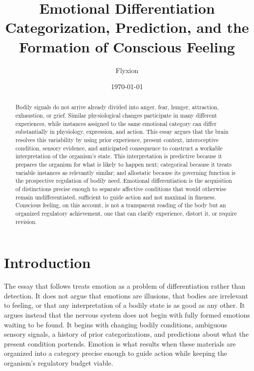 \documentclass[11pt]{article}
\title{Emotional Differentiation\\
\large Categorization, Prediction, and the Formation of Conscious Feeling}
\author{Flyxion}
\date{\today}
\begin{document}
\maketitle

\begin{abstract}
Bodily signals do not arrive already divided into anger, fear, hunger, attraction, exhaustion, or grief. Similar physiological changes participate in many different experiences, while instances assigned to the same emotional category can differ substantially in physiology, expression, and action. This essay argues that the brain resolves this variability by using prior experience, present context, interoceptive condition, sensory evidence, and anticipated consequence to construct a workable interpretation of the organism's state. This interpretation is predictive because it prepares the organism for what is likely to happen next; categorical because it treats variable instances as relevantly similar; and allostatic because its governing function is the prospective regulation of bodily need. Emotional differentiation is the acquisition of distinctions precise enough to separate affective conditions that would otherwise remain undifferentiated, sufficient to guide action and not maximal in fineness. Conscious feeling, on this account, is not a transparent reading of the body but an organized regulatory achievement, one that can clarify experience, distort it, or require revision.
\end{abstract}

\section*{Introduction}

The essay that follows treats emotion as a problem of differentiation rather than detection. It does not argue that emotions are illusions, that bodies are irrelevant to feeling, or that any interpretation of a bodily state is as good as any other. It argues instead that the nervous system does not begin with fully formed emotions waiting to be found. It begins with changing bodily conditions, ambiguous sensory signals, a history of prior categorizations, and predictions about what the present condition portends. Emotion is what results when these materials are organized into a category precise enough to guide action while keeping the organism's regulatory budget viable.
\end{document}
